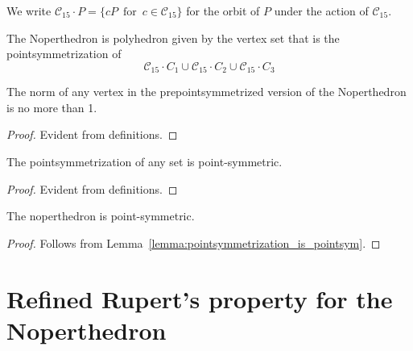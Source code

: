 We write $\mathcal{C}_{15} \cdot P = \{c P \,\text{ for } \, c \in \mathcal{C}_{15}\}$ for the orbit of $P$ under the action of $\mathcal{C}_{15}$.

\begin{definition}
\label{def:noperthedron}
\leanok
The Noperthedron is polyhedron given by the vertex set that is the
pointsymmetrization of
\[\mathcal{C}_{15} \cdot C_1 \cup \mathcal{C}_{15} \cdot C_2 \cup \mathcal{C}_{15} \cdot C_3\]
\end{definition}

\begin{lemma}
\label{lemma:half_nopert_verts_norm_le_one}
\leanok
The norm of any vertex in the prepointsymmetrized version of the Noperthedron is no more than 1.
\end{lemma}
\begin{proof}
\leanok
Evident from definitions.
\end{proof}

\begin{lemma}
\label{lemma:pointsymmetrization_is_pointsym}
\leanok
The pointsymmetrization of any set is point-symmetric.
\end{lemma}
\begin{proof}
\leanok
Evident from definitions.
\end{proof}

\begin{lemma}
\label{lemma:nopert_point_symmetric}
\leanok
{}
The noperthedron is point-symmetric.
\end{lemma}
\begin{proof}
\leanok
{}
Follows from Lemma~\ref{lemma:pointsymmetrization_is_pointsym}.
\end{proof}

\section{Refined Rupert's property for the Noperthedron}

